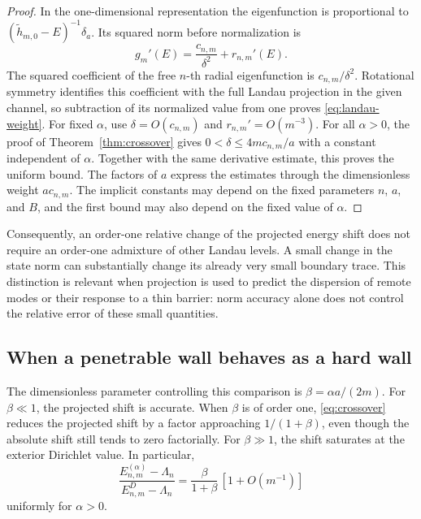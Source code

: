 \documentclass[12pt,a4paper]{article}
\numberwithin{equation}{section}
\theoremstyle{remark}
\theoremstyle{definition}
\begin{document}
\begin{proof}
In the one-dimensional representation the eigenfunction is proportional
to $(\widetilde h_{m,0}-E)^{-1}\delta_a$. Its squared norm before
normalization is
$$
g_m'(E)=\frac{c_{n,m}}{\delta^2}+r_{n,m}'(E).
$$
The squared coefficient of the free $n$-th radial eigenfunction is
$c_{n,m}/\delta^2$. Rotational symmetry identifies this coefficient
with the full Landau projection in the given channel, so subtraction
of its normalized value from one proves \eqref{eq:landau-weight}.
For fixed $\alpha$, use $\delta=O(c_{n,m})$ and
$r_{n,m}'=O(m^{-3})$. For all $\alpha>0$, the proof of
Theorem~\ref{thm:crossover} gives
$0<\delta\le4mc_{n,m}/a$ with a constant independent of $\alpha$.
Together with the same derivative estimate, this proves the uniform
bound. The factors of $a$ express the estimates through the dimensionless
weight $a c_{n,m}$. The implicit constants may depend on the fixed
parameters $n$, $a$, and $B$, and the first bound may also depend on the
fixed value of $\alpha$.
\end{proof}

Consequently, an order-one relative change of the projected energy shift
does not require an order-one admixture of other Landau levels. A small
change in the state norm can substantially change its already very small
boundary trace. This distinction is relevant when projection is used
to predict the dispersion of remote modes or their response to a thin
barrier: norm accuracy alone does not control the relative error of
these small quantities.

\subsection{When a penetrable wall behaves as a hard wall}

The dimensionless parameter controlling this comparison is
$\beta=\alpha a/(2m)$. For $\beta\ll1$, the projected shift is accurate.
When $\beta$ is of order one, \eqref{eq:crossover} reduces the projected
shift by a factor approaching $1/(1+\beta)$, even though the absolute
shift still tends to zero factorially. For $\beta\gg1$, the shift
saturates at the exterior Dirichlet value. In particular,
\begin{equation}\label{eq:wall-ratio}
\frac{E_{n,m}^{(\alpha)}-\Lambda_n}{E_{n,m}^{D}-\Lambda_n}
=\frac{\beta}{1+\beta}\,[1+O(m^{-1})]
\end{equation}
uniformly for $\alpha>0$.
\end{document}
